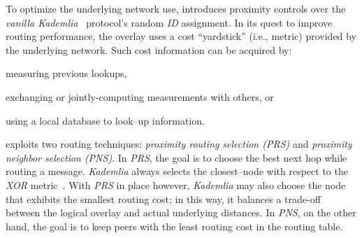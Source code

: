 
To optimize the underlying network use,
\cite{KLKP2008} introduces proximity
controls over the \emph{vanilla Kademlia}~\cite{maymounkov_kademlia_2002} 
protocol's random \emph{ID} assignment.
In its quest to improve routing performance, the overlay uses 
a cost ``yardstick'' (i.e., metric) provided by the underlying network.
Such cost information can be acquired by:
\begin{inparaenum}
  \item measuring previous lookups,
  \item exchanging or jointly-computing measurements with others, or 
  \item using a local database to look--up information.
\end{inparaenum}

\cite{KLKP2008} exploits two routing techniques: 
\emph{proximity routing selection (PRS)} and 
\emph{proximity neighbor selection (PNS)}.
In \emph{PRS}, the goal is to choose the best next hop while routing a message.
\emph{Kademlia} always selects the closest--node 
with respect to the \emph{XOR} metric~\cite{maymounkov_kademlia_2002}.
With \emph{PRS} in place however, \emph{Kademlia} may also choose 
the node that exhibits the smallest routing cost; in this way, 
it balances a trade-off between the logical overlay and 
actual underlying distances.
In \emph{PNS}, on the other hand, the goal is to keep peers 
with the least routing cost in the routing table. 

